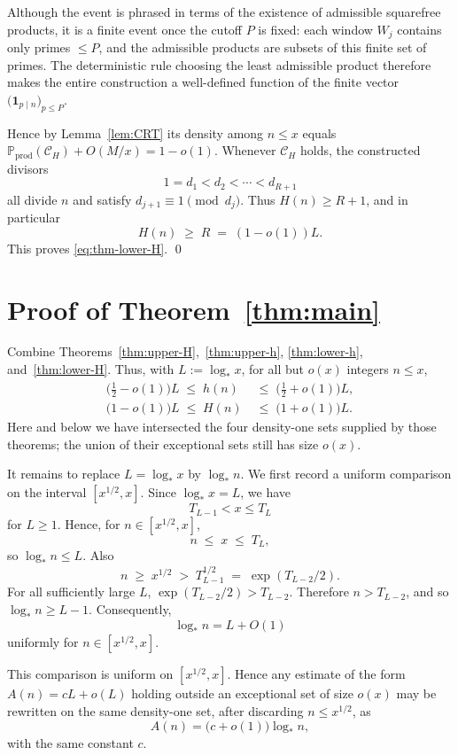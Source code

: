 \documentclass[11pt,reqno]{amsart}
\theoremstyle{plain}
\theoremstyle{definition}
\newcommand{\PP}{\mathbb{P}}
\newcommand{\logstar}{\log_{\!*}}
\begin{document}
Although the event is phrased in terms of the existence of admissible
squarefree products, it is a finite event once the cutoff $P$ is fixed: each
window $W_j$ contains only primes $\le P$, and the admissible products are
subsets of this finite set of primes. The deterministic rule choosing the least
admissible product therefore makes the entire construction a well-defined
function of the finite vector
$\bigl(\mathbf 1_{p\mid n}\bigr)_{p\le P}$.

Hence by
Lemma~\ref{lem:CRT} its density among $n\le x$ equals
$\PP_{\mathrm{prod}}(\mathcal{C}_H)+O(M/x)=1-o(1)$.
Whenever $\mathcal{C}_H$ holds, the constructed divisors
\[
1=d_1<d_2<\cdots<d_{R+1}
\]
all divide $n$ and satisfy $d_{j+1}\equiv 1\pmod{d_j}$. Thus $H(n)\ge R+1$,
and in particular
\[
H(n)\;\ge\; R\;=\;(1-o(1))L.
\]
This proves \eqref{eq:thm-lower-H}. \qed

\section{Proof of Theorem~\ref{thm:main}}\label{sec:proof-of-main}

Combine Theorems~\ref{thm:upper-H},~\ref{thm:upper-h},
\ref{thm:lower-h}, and~\ref{thm:lower-H}. Thus, with $L:=\logstar x$, for all
but $o(x)$ integers $n\le x$,
\begin{align}
\bigl(\tfrac12-o(1)\bigr)L
\;\le\;
h(n)
&\;\le\;
\bigl(\tfrac12+o(1)\bigr)L,
\label{eq:h-L-bounds}\\
\bigl(1-o(1)\bigr)L
\;\le\;
H(n)
&\;\le\;
\bigl(1+o(1)\bigr)L.
\label{eq:H-L-bounds}
\end{align}
Here and below we have intersected the four density-one sets supplied by those
theorems; the union of their exceptional sets still has size $o(x)$.

It remains to replace $L=\logstar x$ by $\logstar n$. We first record a
uniform comparison on the interval $[x^{1/2},x]$. Since $\logstar x=L$, we
have
\[
T_{L-1}<x\le T_L
\]
for $L\ge 1$. Hence, for $n\in[x^{1/2},x]$,
\[
n\;\le\; x\;\le\; T_L,
\]
so $\logstar n\le L$. Also
\[
n \;\ge\; x^{1/2} \;>\; T_{L-1}^{1/2} \;=\; \exp(T_{L-2}/2).
\]
For all sufficiently large $L$, $\exp(T_{L-2}/2)>T_{L-2}$. Therefore $n>T_{L-2}$,
and so $\logstar n\ge L-1$. Consequently,
\begin{equation}\label{eq:logstar-comparison}
\logstar n=L+O(1)
\end{equation}
uniformly for $n\in[x^{1/2},x]$.

This comparison is uniform on $[x^{1/2},x]$. Hence any estimate of the form
$A(n)=cL+o(L)$ holding outside an exceptional set of size $o(x)$ may be
rewritten on the same density-one set, after discarding $n\le x^{1/2}$, as
\[
   A(n)=\bigl(c+o(1)\bigr)\logstar n,
\]
with the same constant $c$.
\end{document}
